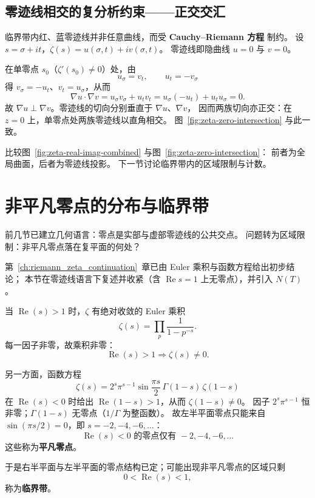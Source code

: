 \subsection{零迹线相交的复分析约束——正交交汇}

临界带内红、蓝零迹线并非任意曲线，而受 \textbf{Cauchy--Riemann 方程} 制约。
设 $s=\sigma+it$，$\zeta(s)=u(\sigma,t)+iv(\sigma,t)$。
零迹线即隐曲线 $u=0$ 与 $v=0$。

在单零点 $s_0$（$\zeta'(s_0)\neq 0$）处，由
\[
u_{\sigma}=v_{t},\qquad u_{t}=-v_{\sigma}
\]
得 $v_{\sigma}=-u_{t}$、$v_{t}=u_{\sigma}$，从而
\[
\nabla u\cdot\nabla v
=u_{\sigma}v_{\sigma}+u_{t}v_{t}
=u_{\sigma}(-u_{t})+u_{t}u_{\sigma}=0.
\]
故 $\nabla u\perp\nabla v$。零迹线的切向分别垂直于 $\nabla u$、$\nabla v$，
因而两族切向亦正交：在 $z=0$ 上，单零点处两族零迹线以直角相交。
图~\ref{fig:zeta-zero-intersection} 与此一致。

比较图~\ref{fig:zeta-real-imag-combined} 与图~\ref{fig:zeta-zero-intersection}：
前者为全局曲面，后者为零迹线投影。
下一节讨论临界带内的区域限制与计数。

\section{非平凡零点的分布与临界带}\label{sec:zero-distribution-strip}

前几节已建立几何语言：零点是实部与虚部零迹线的公共交点。
问题转为区域限制：非平凡零点落在复平面的何处？

第~\ref{ch:riemann_zeta_continuation}~章已由 Euler 乘积与函数方程给出初步结论；
本节在零迹线语言下复述并收紧（含 $\operatorname{Re}s=1$ 上无零点），并引入 $N(T)$。

当 $\operatorname{Re}(s)>1$ 时，$\zeta$ 有绝对收敛的 Euler 乘积
\[
\zeta(s)=\prod_{p}\frac{1}{1-p^{-s}}.
\]
每一因子非零，故乘积非零：
\[
\boxed{
\operatorname{Re}(s)>1
\Longrightarrow
\zeta(s)\neq0.
}
\]

另一方面，函数方程
\[
\zeta(s)
=
2^s\pi^{s-1}\sin\frac{\pi s}{2}\,\Gamma(1-s)\,\zeta(1-s)
\]
在 $\operatorname{Re}(s)<0$ 时给出 $\operatorname{Re}(1-s)>1$，从而 $\zeta(1-s)\neq 0$。
因子 $2^s\pi^{s-1}$ 恒非零；$\Gamma(1-s)$ 无零点（$1/\Gamma$ 为整函数）。
故左半平面零点只能来自 $\sin(\pi s/2)=0$，即 $s=-2,-4,-6,\ldots$：
\[
\boxed{
\operatorname{Re}(s)<0
\text{ 的零点仅有 }
-2,-4,-6,\ldots
}
\]
这些称为\textbf{平凡零点}。

于是右半平面与左半平面的零点结构已定；可能出现非平凡零点的区域只剩
\[
0<\operatorname{Re}(s)<1,
\]
称为\textbf{临界带}。

